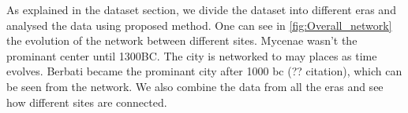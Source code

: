   
As explained in the dataset section, we divide the dataset into different eras and analysed the data using proposed method. One can see in \ref{fig:Overall_network} the evolution of the network between different sites. Mycenae wasn't the prominant center until 1300BC. The city is networked to may places as time evolves. Berbati became the prominant city after 1000 bc (?? citation), which can be seen from the network.
We also combine the data from all the eras and see how different sites are connected. 
